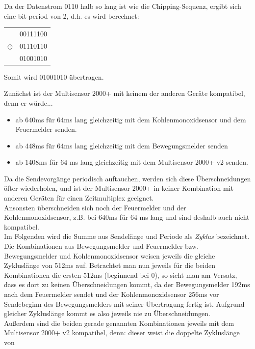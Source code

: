 \documentclass{../exercisesheet}
\begin{document}
\begin{exercise}{3}
	\begin{subexercise}
	Da der Datenstrom 0110 halb so lang ist wie die Chipping-Sequenz, ergibt sich eine bit period von 2, d.h. es wird berechnet:
	\begin{table}[H]
	\centering
	\begin{tabular}{ll}
     	  & 00111100 \\
	$\oplus$ & 01110110 \\ \cline{2-2} 
     	 \rule{0pt}{3ex} & 01001010
	\end{tabular}
	\end{table}
	Somit wird 01001010 übertragen.
	\end{subexercise}

	\begin{subexercise}
	Zunächst ist der Multisensor 2000+ mit keinem der anderen Geräte kompatibel, denn er würde...
	\begin{itemize}
	\item ab 640ms für 64ms lang gleichzeitig mit dem Kohlenmonoxidsensor und dem Feuermelder senden.
	\item ab 448ms für 64ms lang gleichzeitig mit dem Bewegungsmelder senden
	\item ab 1408ms für 64 ms lang gleichzeitig mit dem Multisensor 2000+ v2 senden.
	\end{itemize}
	Da die Sendevorgänge periodisch auftauchen, werden sich diese Überschneidungen öfter wiederholen, und ist der Multisensor 2000+ in keiner Kombination
	mit anderen Geräten für einen Zeitmultiplex geeignet.\\
	Ansonsten überschneiden sich noch der Feuermelder und der Kohlenmonoxidsensor, z.B. bei 640ms für 64 ms lang und sind deshalb auch nicht kompatibel.\\
	Im Folgenden wird die Summe aus Sendelänge und Periode als \textit{Zyklus} bezeichnet. Die Kombinationen aus Bewegungsmelder und Feuermelder bzw.
	Bewegungsmelder und Kohlenmonoxidsensor weisen jeweils die gleiche Zykluslänge von 512ms auf. Betrachtet man nun jeweils für die beiden Kombinationen
	die ersten 512ms (beginnend bei 0), so sieht man am Versatz, dass es dort zu keinen Überschneidungen kommt, da der Bewegungsmelder 192ms nach dem
	Feuermelder sendet und der Kohlenmonoxidsensor 256ms vor Sendebeginn des Bewegungsmelders mit seiner Übertragung fertig ist. Aufgrund gleicher Zykluslänge
	kommt es also jeweils nie zu Überschneidungen.\\
	Außerdem sind die beiden gerade genannten Kombinationen jeweils mit dem Multisensor 2000+ v2 kompatibel, denn: dieser weist die doppelte Zykluslänge von

\end{subexercise}
\end{exercise}
\end{document}
